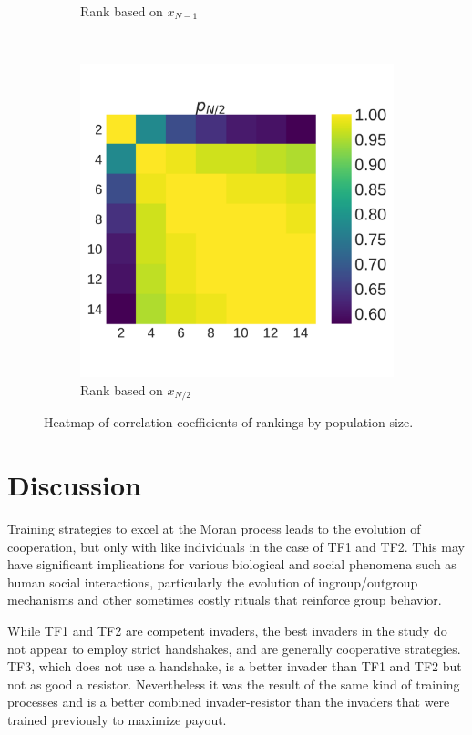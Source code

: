 \documentclass[10pt,journal]{IEEEtran}
\begin{document}
\begin{figure}[!htbp]
\begin{subfigure}[t]{.3\columnwidth}
        \caption{Rank based on \(x_{N - 1}\)}
    \end{subfigure}
    ~
    \begin{subfigure}[t]{.3\columnwidth}
        \centering
        \includegraphics[width=\columnwidth]{img/correlation_heatmap_coexist.pdf}
        \caption{Rank based on \(x_{N/2}\)}
    \end{subfigure}
    \caption{Heatmap of correlation coefficients of rankings by population size.}
    \label{fig:correlation_coefficients}
\end{figure}

\section{Discussion}

Training strategies to excel
at the Moran process leads to the evolution of cooperation, but only with like
individuals in the case of TF1 and TF2. This may have significant implications
for various biological and social phenomena such as
human social interactions, particularly the evolution of ingroup/outgroup mechanisms
and other sometimes costly rituals that reinforce group behavior.

While TF1 and TF2 are competent invaders, the best invaders
in the study do not appear to employ strict handshakes, and are generally
cooperative strategies. TF3, which does not use a handshake, is a better invader
than TF1 and TF2 but not as good a resistor. Nevertheless it was the result
of the same kind of training processes and is a better combined invader-resistor
than the invaders that were trained previously to maximize payout.
\end{document}
